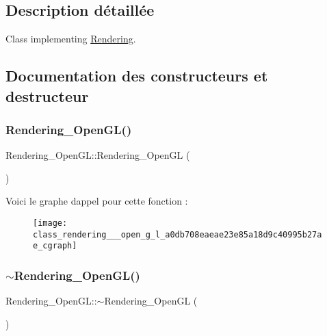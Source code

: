 \subsection{Description détaillée}
Class implementing \hyperlink{class_rendering}{Rendering}. 

\subsection{Documentation des constructeurs et destructeur}
\mbox{\label{class_rendering___open_g_l_a0db708eaeae23e85a18d9c40995b27ae}} 
\subsubsection{\texorpdfstring{Rendering\+\_\+\+Open\+G\+L()}{Rendering\_OpenGL()}}
{\footnotesize\ttfamily Rendering\+\_\+\+Open\+G\+L\+::\+Rendering\+\_\+\+Open\+GL (\begin{DoxyParamCaption}{ }\end{DoxyParamCaption})\hspace{0.3cm}{\ttfamily [inline]}}

Voici le graphe d\textquotesingle{}appel pour cette fonction \+:\nopagebreak
\begin{figure}[H]
\begin{center}
\leavevmode
\texttt{[image: class\_rendering\_\_\_open\_g\_l\_a0db708eaeae23e85a18d9c40995b27ae\_cgraph]}
\end{center}
\end{figure}
\mbox{\label{class_rendering___open_g_l_a32ff44fc5d3a776a6add4eef3f662a96}} 
\subsubsection{\texorpdfstring{$\sim$\+Rendering\+\_\+\+Open\+G\+L()}{~Rendering\_OpenGL()}}
{\footnotesize\ttfamily Rendering\+\_\+\+Open\+G\+L\+::$\sim$\+Rendering\+\_\+\+Open\+GL (\begin{DoxyParamCaption}{ }\end{DoxyParamCaption})}


